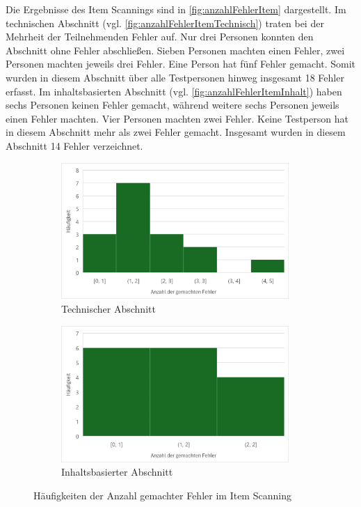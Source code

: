 Die Ergebnisse des Item Scannings sind in \autoref{fig:anzahlFehlerItem} dargestellt. Im technischen Abschnitt (vgl. \autoref{fig:anzahlFehlerItemTechnisch}) traten bei der Mehrheit der Teilnehmenden Fehler auf. Nur drei Personen konnten den Abschnitt ohne Fehler abschließen. Sieben Personen machten einen Fehler, zwei Personen machten jeweils drei Fehler. Eine Person hat fünf Fehler gemacht. Somit wurden in diesem Abschnitt über alle Testpersonen hinweg insgesamt 18 Fehler erfasst.
Im inhaltsbasierten Abschnitt (vgl. \autoref{fig:anzahlFehlerItemInhalt}) haben sechs Personen keinen Fehler gemacht, während weitere sechs Personen jeweils einen Fehler machten. Vier Personen machten zwei Fehler. Keine Testperson hat in diesem Abschnitt mehr als zwei Fehler gemacht. Insgesamt wurden in diesem Abschnitt 14 Fehler verzeichnet.

\begin{figure}[tbh]
    \centering
    \begin{subfigure}{.5\textwidth}
        \centering
        \includegraphics[width=0.95\textwidth]{images/Results/Histogramm-Anzahl-Fehler-technisch-item.png}
        \caption{Technischer Abschnitt}
        \label{fig:anzahlFehlerItemTechnisch}
    \end{subfigure}%
    \begin{subfigure}{.5\textwidth}
        \centering
        \includegraphics[width=0.95\textwidth]{images/Results/Histogramm-Anzahl-Fehler-inhalt-item.png}
        \caption{Inhaltsbasierter Abschnitt}
        \label{fig:anzahlFehlerItemInhalt}
   \end{subfigure}
   \caption{Häufigkeiten der Anzahl gemachter Fehler im Item Scanning}
   \label{fig:anzahlFehlerItem}
\end{figure}
\

